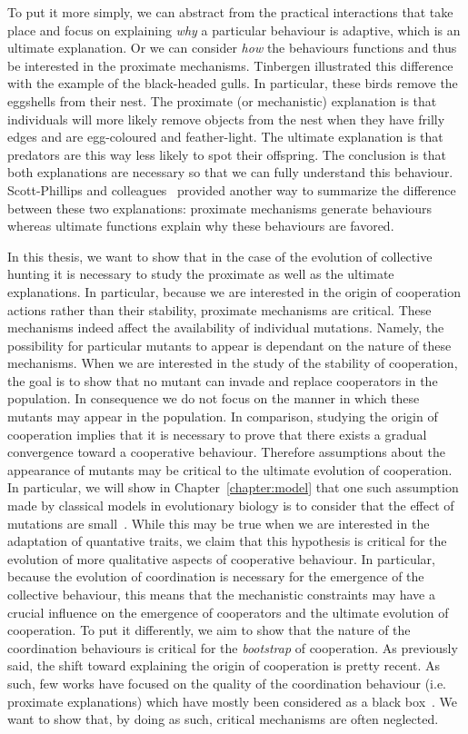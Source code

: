     To put it more simply, we can abstract from the practical interactions that take place and focus on explaining \emph{why} a particular behaviour is adaptive, which is an ultimate explanation. Or we can consider \emph{how} the behaviours functions and thus be interested in the proximate mechanisms. Tinbergen illustrated this difference with the example of the black-headed gulls. In particular, these birds remove the eggshells from their nest. The proximate (or mechanistic) explanation is that individuals will more likely remove objects from the nest when they have frilly edges and are egg-coloured and feather-light. The ultimate explanation is that predators are this way less likely to spot their offspring. The conclusion is that both explanations are necessary so that we can fully understand this behaviour. Scott-Phillips and colleagues~\parencite{Scott-Phillips2011} provided another way to summarize the difference between these two explanations: proximate mechanisms generate behaviours whereas ultimate functions explain why these behaviours are favored.

    In this thesis, we want to show that in the case of the evolution of collective hunting it is necessary to study the proximate as well as the ultimate explanations. In particular, because we are interested in the origin of cooperation actions rather than their stability, proximate mechanisms are critical. These mechanisms indeed affect the availability of individual mutations. Namely, the possibility for particular mutants to appear is dependant on the nature of these mechanisms. When we are interested in the study of the stability of cooperation, the goal is to show that no mutant can invade and replace cooperators in the population. In consequence we do not focus on the manner in which these mutants may appear in the population. In comparison, studying the origin of cooperation implies that it is necessary to prove that there exists a gradual convergence toward a cooperative behaviour. Therefore assumptions about the appearance of mutants may be critical to the ultimate evolution of cooperation. In particular, we will show in Chapter~\ref{chapter:model} that one such assumption made by classical models in evolutionary biology is to consider that the effect of mutations are small~\parencite{Geritz1998, McGill2007}. While this may be true when we are interested in the adaptation of quantative traits, we claim that this hypothesis is critical for the evolution of more qualitative aspects of cooperative behaviour. In particular, because the evolution of coordination is necessary for the emergence of the collective behaviour, this means that the mechanistic constraints may have a crucial influence on the emergence of cooperators and the ultimate evolution of cooperation. To put it differently, we aim to show that the nature of the coordination behaviours is critical for the \emph{bootstrap} of cooperation. As previously said, the shift toward explaining the origin of cooperation is pretty recent. As such, few works have focused on the quality of the coordination behaviour (i.e. proximate explanations) which have mostly been considered as a black box~\parencite{Calcott2007a}. We want to show that, by doing as such, critical mechanisms are often neglected.

